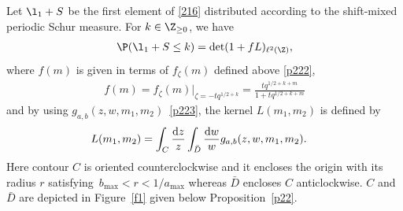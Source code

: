 \begin{Proposition}\label{p25}
 Let $\l_1+S$ be the first element of \eqref{216} distributed according to the shift-mixed periodic Schur measure.
 For $k\in\Z_{\ge 0}$, we have
\begin{align} \label{p251}
 \P (\l_1+S\le k )
 =\det (1+f L )_{\ell^2(\Z)},
\end{align}
 where
 $f(m)$ is given in terms of
 $f_{\zeta}(m)$ defined above \eqref{p222},
\begin{align}
\label{p251-1}
 f(m)=f_{\zeta}(m)|_{\zeta=-tq^{1/2+k}}
 =\frac{tq^{1/2+k+m}}{1+tq^{1/2+k+m}}
\end{align}
and
by using $g_{a,b}(z,w,m_1,m_2)$~\eqref{p223},
the kernel
$L(m_1,m_2)$ is defined by
\begin{align}
&L(m_1,m_2)=
\int_C\frac{{\rm d}z}{z}\int_{\bar{D}}\frac{{\rm d}w}{w}
g_{a,b}(z,w,m_1,m_2).
\label{t252}
\end{align}
Here contour $C$ is oriented counterclockwise and it encloses the origin with its radius
$r$ satisfying~${b_{\max}<r<1/a_{\max}}$
whereas $\bar{D}$ encloses $C$
anticlockwise.
$C$ and $\bar{D}$ are depicted in Figure~{\rm\ref{f1}}
given below Proposition~{\rm\ref{p22}}.

\end{Proposition}


